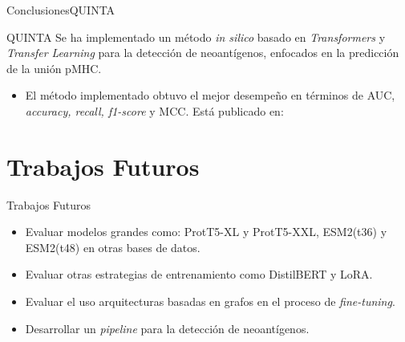 \documentclass[10pt]{beamer}
\newcommand{\chref}[3][blue]{\href{#2}{\color{#1}{#3}}}%
\newcommand{\chref}[2]{	\href{#1}{{\usebeamercolor[bg]{Feather}#2}} }
\newcommand{\chref}[3][blue]{\href{#2}{\color{#1}{#3}}}%
\newcommand{\1}{
	\setbeamertemplate{background}{
		\texttt{[image: img/1]}
		\tikz[overlay] \fill[fill opacity=0.75,fill=white] (0,0) rectangle (-\paperwidth,\paperheight);
	}
}
\begin{document}
\begin{frame}{Conclusiones}{QUINTA}	
	\begin{block}{QUINTA}
		Se ha implementado un método  \textit{in silico} basado en \textit{Transformers} y \textit{Transfer Learning} para la detección de neoantígenos, enfocados en la predicción de la unión pMHC. 
		
		\begin{itemize}
			\item El método implementado obtuvo el mejor desempeño en términos de AUC, \textit{accuracy, recall, f1-score} y MCC. Está publicado en: \chref{https://github.com/arceda/pmhc}{https://github.com/arceda/pmhc}	
		\end{itemize}		
	\end{block}	
\end{frame}


\section{Trabajos Futuros}

\begin{frame}{Trabajos Futuros}{}	
	\begin{block}{}
		\begin{itemize}
			\item Evaluar modelos grandes como: ProtT5-XL y ProtT5-XXL, ESM2(t36) y ESM2(t48) en otras bases de datos.
			\item Evaluar otras estrategias de entrenamiento como DistilBERT y LoRA.
			\item Evaluar el uso arquitecturas basadas en grafos en el proceso de \textit{fine-tuning}.
			\item Desarrollar un \textit{pipeline} para la detección de neoantígenos.
		\end{itemize}
	\end{block}		
\end{frame}
\end{document}
